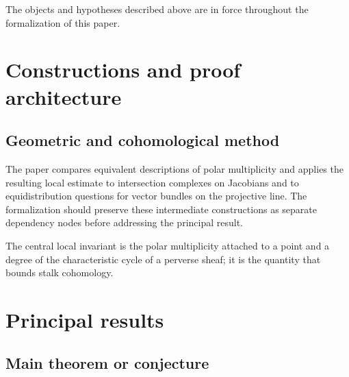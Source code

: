 \begin{convention}
\label{bounds-stalks-perverse-sheaves-characteristic-p-shende-setup}
The objects and hypotheses described above are in force throughout the
formalization of this paper.
\notready
\end{convention}

\chapter{Constructions and proof architecture}
\label{chap:bounds-stalks-perverse-sheaves-characteristic-p-shende-method}

\section{Geometric and cohomological method}
\label{sec:bounds-stalks-perverse-sheaves-characteristic-p-shende-method}

The paper compares equivalent descriptions of polar multiplicity and applies the resulting local estimate to intersection complexes on Jacobians and to equidistribution questions for vector bundles on the projective line. The formalization should preserve these intermediate constructions
as separate dependency nodes before addressing the principal result.

\begin{definition}
\label{bounds-stalks-perverse-sheaves-characteristic-p-shende-central-object}
The central local invariant is the polar multiplicity attached to a point and a degree of the characteristic cycle of a perverse sheaf; it is the quantity that bounds stalk cohomology.
\notready
\end{definition}

\chapter{Principal results}
\label{chap:bounds-stalks-perverse-sheaves-characteristic-p-shende-results}

\section{Main theorem or conjecture}
\label{sec:bounds-stalks-perverse-sheaves-characteristic-p-shende-results}

